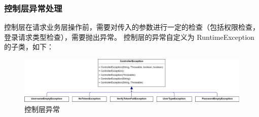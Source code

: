\documentclass[12pt, a4paper]{article}
\begin{document}
\subsubsection{控制层异常处理}
控制层在请求业务层操作前，需要对传入的参数进行一定的检查（包括权限检查，登录请求类型检查），需要抛出异常。
控制层的异常自定义为 RuntimeException 的子类，如下：
\begin{figure}[H]
	\centering
	\includegraphics[width = 0.9 \textwidth]{ControllerException.png}
	\caption{控制层异常}
\end{figure}
\end{document}
